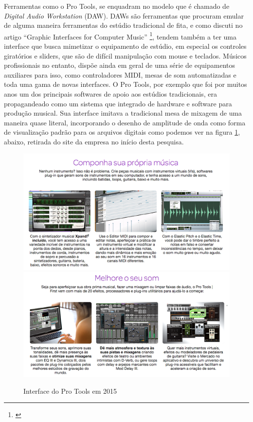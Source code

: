 Ferramentas como o Pro Tools, se enquadram no modelo que é chamado de \emph{Digital Audio Workstation} (DAW). DAWs são ferramentas que procuram emular de alguma maneira ferramentas do estúdio tradicional de fita, e como discuti no artigo ``Graphic Interfaces for Computer Music'' \footnote{\cite{Stolfi2016}}, tendem também a ter uma interface que busca mimetizar o equipamento de estúdio, em especial os controles giratórios e sliders, que são de difícil manipulação com mouse e teclados. Músicos profissionais no entanto, dispõe ainda em geral de uma série de equipamentos auxiliares para isso, como controladores MIDI, mesas de som automatizadas e toda uma gama de novas interfaces. O Pro Tools, por exemplo que foi por muitos anos um dos principais softwares de apoio aos estúdios tradicionais, era propagandeado como um sistema que integrado de hardware e software para produção musical. Sua interface imitava a tradicional mesa de mixagem de uma maneira quase literal, incorporando o desenho de amplitude de onda como forma de visualização padrão para os arquivos digitais como podemos ver na figura \ref{protools}, abaixo, retirada do site da empresa no início desta pesquisa.


\begin{figure}
    \caption{\label{protools}Interface do Pro Tools em 2015 }
    
        \includegraphics[width=0.8\linewidth]{pictures/protools}
        \includegraphics[width=0.8\linewidth]{pictures/protools2}
    
\end{figure}

